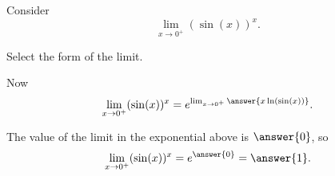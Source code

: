 \documentclass{ximera}
\author{Nela Lakos \and Kyle Parsons}
\begin{document}
\begin{exercise}

Consider
\[
\lim_{x\to0^+} (\sin(x))^x.
\]

Select the form of the limit.
\begin{multipleChoice}
\end{multipleChoice}

Now
\[
\lim_{x\to0^+} (\sin(x))^x = e^{\lim_{x\to0^+}\answer{x \ln(\sin(x))}}.
\]

The value of the limit in the exponential above is $\answer{0}$, so
\[
\lim_{x\to0^+} (\sin(x))^x = e^{\answer{0}} = \answer{1}.
\]

\end{exercise}
\end{document}
